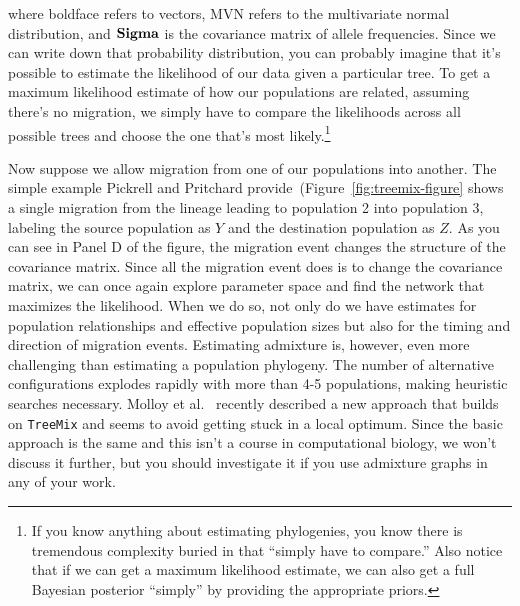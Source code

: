 \documentclass[12pt]{article}
\begin{document}
where boldface refers to vectors, MVN refers to the multivariate
normal distribution, and $\bf Sigma$ is the covariance matrix of
allele frequencies. Since we can write down that probability
distribution, you can probably imagine that it's possible to estimate
the likelihood of our data given a particular tree. To get a maximum
likelihood estimate of how our populations are related, assuming
there's no migration, we simply have to compare the likelihoods across
all possible trees and choose the one that's most likely.\footnote{If
  you know anything about estimating phylogenies, you know there is
  tremendous complexity buried in that ``simply have to compare.''
  Also notice that if we can get a maximum likelihood estimate, we can
  also get a full Bayesian posterior ``simply'' by providing the
  appropriate priors.}

Now suppose we allow migration from one of our populations into
another. The simple example Pickrell and Pritchard
provide~(Figure~\ref{fig:treemix-figure} shows a single migration from
the lineage leading to population 2 into population 3, labeling the
source population as $Y$ and the destination population as $Z$. As you
can see in Panel D of the figure, the migration event changes the
structure of the covariance matrix. Since all the migration event does
is to change the covariance matrix, we can once again explore
parameter space and find the network that maximizes the
likelihood. When we do so, not only do we have estimates for
population relationships and effective population sizes but also for
the timing and direction of migration events. Estimating admixture is,
however, even more challenging than estimating a population
phylogeny. The number of alternative configurations explodes rapidly
with more than 4-5 populations, making heuristic searches
necessary. Molloy et al.~\cite{Molloy-etal-2021} recently described a
new approach that builds on {\tt TreeMix} and seems to avoid getting
stuck in a local optimum. Since the basic approach is the same and
this isn't a course in computational biology, we won't discuss it
further, but you should investigate it if you use admixture graphs in
any of your work.
\end{document}

